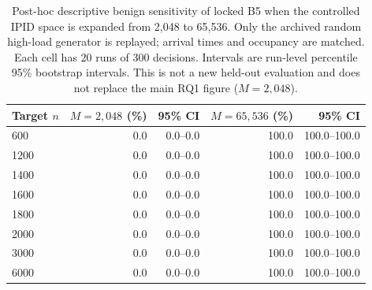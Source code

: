 \begin{table}[t]
\centering
\caption{Post-hoc descriptive benign sensitivity of locked B5 when the controlled IPID space is expanded from 2,048 to 65,536. Only the archived random high-load generator is replayed; arrival times and occupancy are matched. Each cell has 20 runs of 300 decisions. Intervals are run-level percentile 95\% bootstrap intervals. This is not a new held-out evaluation and does not replace the main RQ1 figure ($M=2{,}048$).}
\label{tab:e1-ipid-highload}
\begingroup
\fontsize{9}{10.8}\selectfont
\setlength{\tabcolsep}{3pt}
\begin{tabular}{lrrrr}
\hline
Target $n$ & $M=2{,}048$ (\%) & 95\% CI & $M=65{,}536$ (\%) & 95\% CI \\
\hline
600 & 0.0 & 0.0--0.0 & 100.0 & 100.0--100.0 \\
1200 & 0.0 & 0.0--0.0 & 100.0 & 100.0--100.0 \\
1400 & 0.0 & 0.0--0.0 & 100.0 & 100.0--100.0 \\
1600 & 0.0 & 0.0--0.0 & 100.0 & 100.0--100.0 \\
1800 & 0.0 & 0.0--0.0 & 100.0 & 100.0--100.0 \\
2000 & 0.0 & 0.0--0.0 & 100.0 & 100.0--100.0 \\
3000 & 0.0 & 0.0--0.0 & 100.0 & 100.0--100.0 \\
6000 & 0.0 & 0.0--0.0 & 100.0 & 100.0--100.0 \\
\hline
\end{tabular}
\endgroup
\end{table}
